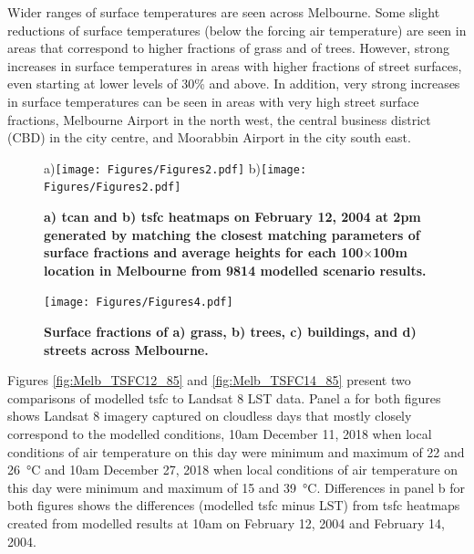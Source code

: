 \documentclass[final,3p,times,authoryear]{elsarticle}
\begin{document}
Wider ranges of surface temperatures are seen across Melbourne. Some slight reductions of surface temperatures (below the forcing air temperature) are seen in areas that correspond to higher fractions of grass and of trees. However, strong increases in surface temperatures in areas with higher fractions of street surfaces, even starting at lower levels of 30\% and above.  In addition, very strong increases in surface temperatures can be seen in areas with very high street surface fractions, Melbourne Airport in the north west, the central business district (CBD) in the city centre, and Moorabbin Airport in the city south east.




\begin{figure}
\centering
a)\texttt{[image: Figures/Figures2.pdf]}
b)\texttt{[image: Figures/Figures2.pdf]}
\caption{\bf a) \gls{tcan} and b) \gls{tsfc} heatmaps on February 12, 2004 at 2pm generated by matching the closest matching parameters of surface fractions and average heights for each 100$\times$100m location in Melbourne from 9814 modelled scenario results.  }
 \label{fig:TaMelb} \label{fig:TsfcMelb}
\end{figure}


\begin{figure}
\centering
\texttt{[image: Figures/Figures4.pdf]}
\caption{\bf Surface fractions of a) grass, b) trees, c) buildings, and d) streets across Melbourne.}
 \label{fig:melfracs}
\end{figure}

Figures \ref{fig:Melb_TSFC12_85} and \ref{fig:Melb_TSFC14_85} present two comparisons of modelled \gls{tsfc} to Landsat 8 LST data. Panel a for both figures shows Landsat 8 imagery captured on cloudless days that mostly closely correspond to the modelled conditions, 10am December 11, 2018 when local conditions of air temperature on this day were minimum and maximum of 22 and 26\SI{}{\degreeCelsius} and 10am December 27, 2018 when local conditions of air temperature on this day were minimum and maximum of 15 and 39\SI{}{\degreeCelsius}. Differences in panel b for both figures shows the differences (modelled \gls{tsfc} minus LST) from \gls{tsfc} heatmaps created from modelled results at 10am on February 12, 2004 and February 14, 2004. 
\end{document}
